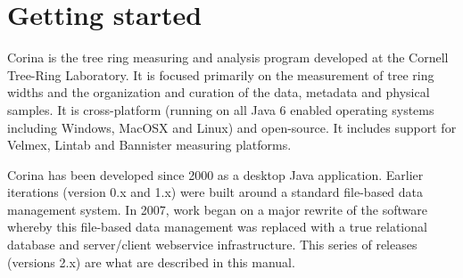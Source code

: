 
\chapter{Getting started}

Corina is the tree ring measuring and analysis program developed at the Cornell Tree-Ring Laboratory. It is focused primarily on the measurement of tree ring widths and the organization and curation of the data, metadata and physical samples. It is cross-platform (running on all Java 6 enabled operating systems including Windows, MacOSX and Linux) and open-source. It includes support for Velmex, Lintab and Bannister measuring platforms.

Corina has been developed since 2000 as a desktop Java application. Earlier iterations (version 0.x and 1.x) were built around a standard file-based data management system. In 2007, work began on a major rewrite of the software whereby this file-based data management was replaced with a true relational database and server/client webservice infrastructure. This series of releases (versions 2.x) are what are described in this manual.




